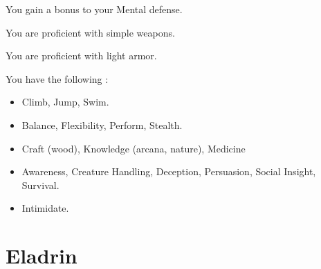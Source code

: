       You gain a  bonus to your Mental defense.

      You are proficient with simple weapons.

      You are proficient with light armor.

      You have the following :
      \begin{itemize}
        \item {} Climb, Jump, Swim.
        \item {} Balance, Flexibility, Perform, Stealth.
        \item {} Craft (wood), Knowledge (arcana, nature), Medicine
        \item {} Awareness, Creature Handling, Deception, Persuasion, Social Insight, Survival.
        \item {} Intimidate.
      \end{itemize}

\section{Eladrin}

